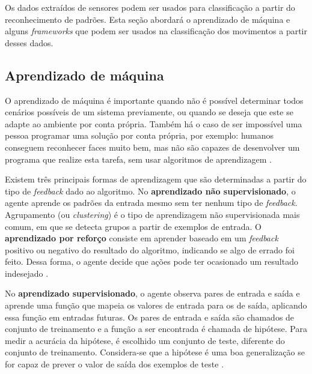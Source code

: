 Os dados extraídos de sensores podem ser usados para classificação a partir do reconhecimento de padrões. Esta seção abordará o aprendizado de máquina e alguns \textit{frameworks} que podem ser usados na classificação dos movimentos a partir desses dados.

\subsection{Aprendizado de máquina}
\label{sec:ml}
O aprendizado de máquina é importante quando não é possível determinar todos cenários possíveis de um sistema previamente, ou quando se deseja que este se adapte ao ambiente por conta própria. Também há o caso de ser impossível uma pessoa programar uma solução por conta própria, por exemplo: humanos conseguem reconhecer faces muito bem, mas não são capazes de desenvolver um programa que realize esta tarefa, sem usar algoritmos de aprendizagem \cite{russell:2010}.

Existem três principais formas de aprendizagem que são determinadas a partir do tipo de \textit{feedback} dado ao algoritmo. No \textbf{aprendizado não supervisionado}, o agente aprende os padrões da entrada mesmo sem ter nenhum tipo de \textit{feedback}. Agrupamento (ou \textit{clustering}) é o tipo de aprendizagem não supervisionada mais comum, em que se detecta grupos a partir de exemplos de entrada. O \textbf{aprendizado por reforço} consiste em aprender baseado em um \textit{feedback} positivo ou negativo do resultado do algoritmo, indicando se algo de errado foi feito. Dessa forma, o agente decide que ações pode ter ocasionado um resultado indesejado \cite{russell:2010}.

No \textbf{aprendizado supervisionado}, o agente observa pares de entrada e saída e aprende uma função que mapeia os valores de entrada para os de saída, aplicando essa função em entradas futuras. Os pares de entrada e saída são chamados de conjunto de treinamento e a função a ser encontrada é chamada de hipótese. Para medir a acurácia da hipótese, é escolhido um conjunto de teste, diferente do conjunto de treinamento. Considera-se que a hipótese é uma boa generalização se for capaz de prever o valor de saída dos exemplos de teste \cite{russell:2010}.


